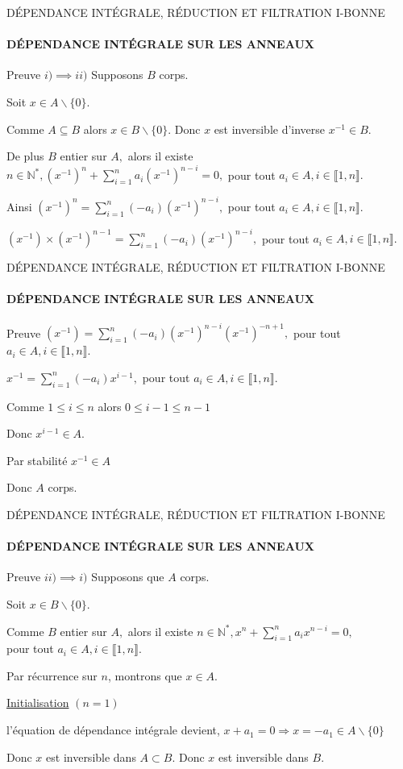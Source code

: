 \documentclass[11pt,a4paper]{beamer}
\begin{document}
\begin{frame}{DÉPENDANCE INTÉGRALE, RÉDUCTION ET FILTRATION I-BONNE}
	\framesubtitle{DÉPENDANCE INTÉGRALE SUR LES ANNEAUX}
	\begin{block}{Preuve}
		$i) \implies  ii)$ Supposons $B$ corps.
		
		Soit $x\in A\backslash \{0\}.$
		
		Comme $A\subseteq B$ alors $x\in B\backslash \{0\}$. Donc $x$ est inversible d'inverse $x^{-1}\in B.$
		
		De plus $B$ entier sur $A,$ alors il existe $n\in \mathbb{N}^{\ast },(x^{-1})^{n}+\sum\limits_{i=1}^{n}a_{i}(x^{-1})^{n-i}=0,$ pour tout 
		$a_{i}\in A,i\in \llbracket 1, n \rrbracket.$
		
		Ainsi $(x^{-1})^{n}=\sum\limits_{i=1}^{n}(-a_{i})(x^{-1})^{n-i},$ pour tout $%
		a_{i}\in A,i\in \llbracket 1, n \rrbracket.$
		
		$(x^{-1})\times (x^{-1})^{n-1}=\sum\limits_{i=1}^{n}(-a_{i})(x^{-1})^{n-i},$
		pour tout $a_{i}\in A,i\in \llbracket 1, n \rrbracket.$
	\end{block}
\end{frame}

\begin{frame}{DÉPENDANCE INTÉGRALE, RÉDUCTION ET FILTRATION I-BONNE}
	\framesubtitle{DÉPENDANCE INTÉGRALE SUR LES ANNEAUX}
	\begin{block}{Preuve}
		$(x^{-1})=\sum\limits_{i=1}^{n}(-a_{i})(x^{-1})^{n-i}(x^{-1})^{-n+1},$ pour
		tout $a_{i}\in A,i\in \llbracket 1, n \rrbracket.$
		
		$x^{-1}=\sum\limits_{i=1}^{n}(-a_{i})x^{i-1},$ pour tout $a_{i}\in A,i\in
		\llbracket 1, n \rrbracket.$
		
		Comme  $1\leq i\leq n$ alors $0\leq i-1\leq n-1$
		
		Donc $x^{i-1}\in A$.
		
		Par stabilité $x^{-1}\in A$
		
		Donc $A$ corps.
	\end{block}
\end{frame}

\begin{frame}{DÉPENDANCE INTÉGRALE, RÉDUCTION ET FILTRATION I-BONNE}
	\framesubtitle{DÉPENDANCE INTÉGRALE SUR LES ANNEAUX}
	\begin{block}{Preuve}
			$ii) \implies i)$ Supposons que $A$ corps.
		
		Soit $x\in B\backslash \{0\}.$
		
		Comme $B$ entier sur $A,$ alors il existe $n\in \mathbb{N}^{\ast },x^{n}+\sum\limits_{i=1}^{n}a_{i}x^{n-i}=0,$\\ pour tout $a_{i}\in
		A,i\in \llbracket 1, n \rrbracket.$
		
		Par récurrence sur $n$, montrons que $x\in A.$
		
		\underline{Initialisation} $(n=1)$
		
		l'équation de dépendance intégrale devient, $x+a_{1}=0%
		\Rightarrow x=-a_{1}\in A\backslash \{0\}$
		
		Donc $x$ est inversible dans $A\subset B.$ Donc $x$ est inversible dans $B.$
	\end{block}
\end{frame}
\end{document}
